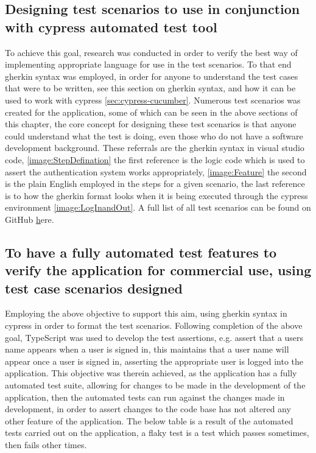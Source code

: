 \subsection{Designing test scenarios to use in conjunction with cypress automated test tool}
To achieve this goal, research was conducted in order to verify the best way of implementing appropriate language for use in the test scenarios. To that end gherkin syntax was employed, in order for anyone to understand the test cases that were to be written, see this section on gherkin syntax, and how it can be used to work with cypress \ref{sec:cypress-cucumber}. Numerous test scenarios was created for the application, some of which can be seen in the above sections of this chapter, the core concept for designing these test scenarios is that anyone could understand what the test is doing, even those who do not have a software development background. These referrals are the gherkin syntax in visual studio code, \ref{image:StepDefination} the first reference is the logic code which is used to assert the authentication system works appropriately, \ref{image:Feature} the second is the plain English employed in the steps for a given scenario, the last reference is to how the gherkin format looks when it is being executed through the cypress environment \ref{image:LogInandOut}. A full list of all test scenarios can be found on GitHub \href{https://github.com/Rshocks/Final-Year-Project/tree/main/QAautomation/cypress/e2e/features}here.

\subsection{To have a fully automated test features to verify the application for commercial use, using test case scenarios designed}
Employing the above objective to support this aim, using gherkin syntax in cypress in order to format the test scenarios. Following completion of the above goal, TypeScript was used to develop the test assertions, e.g. assert that a users name appears when a user is signed in, this maintains that a user name will appear once a user is signed in, asserting the appropriate user is logged into the application. This objective was therein achieved, as the application has a fully automated test suite, allowing for changes to be made in the development of the application, then the automated tests can run against the changes made in development, in order to assert changes to the code base has not altered any other feature of the application. The below table is a result of the automated tests carried out on the application, a flaky test is a test which passes sometimes, then fails other times.

